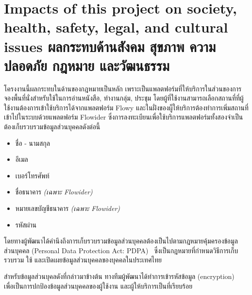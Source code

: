 \section{\ifenglish%
Impacts of this project on society, health, safety, legal, and cultural issues
\else%
ผลกระทบด้านสังคม สุขภาพ ความปลอดภัย กฎหมาย และวัฒนธรรม
\fi}

โครงงานนี้ผลกระทบในด้านของกฎหมายเป็นหลัก เพราะเป็นแพลตฟอร์มที่ให้บริการในส่วนของการจองพื้นที่นั่งสำหรับใช้ในการอ่านหนังสือ, ทํางานกลุ่ม, ประชุม โดยผู้ที่ใช้งานสามารถเลือกสถานที่ที่ผู้ใช้งานต้องการเข้าใช้บริการได้จากแพลตฟอร์ม Flowy และในฝั่งของผู็ให้บริการต้องทำการเพิ่มสถานที่เข้าไปในระบบด้วยแพลตฟอร์ม Flowider ซึ่งการลงทะเบียนเพื่อใช้บริการแพลตฟอร์มทั้งสองจำเป็นต้องเก็บรวบรวมข้อมูลส่วนบุคคลดังต่อนี้
\begin{itemize}
    \item ชื่อ - นามสกุล
    \item อีเมล
    \item เบอร์โทรศัพท์
    \item ชื่อธนาคาร \textit{(เฉพาะ Flowider)}
    \item หมายเลขบัญชีธนาคาร \textit{(เฉพาะ Flowider)}
    \item รหัสผ่าน
\end{itemize}
โดยทางผู้พัฒนาได้คำนึงถึงการเก็บรวบรวมข้อมูลส่วนบุคคลต้องเป็นไปตามกฎหมายคุ้มครองข้อมูลส่วนบุคคล (Personal Data Protection Act: PDPA)~\cite{pdpa} ซึ่งเป็นกฎหมายที่กำหนดวิธีการเก็บรวบรวม ใช้ และเปิดเผยข้อมูลส่วนบุคคลของบุคคลในประเทศไทย

สำหรับข้อมูลส่วนบุคลดังที่กล่าวมาข้างต้น ทางทีมผู้พัฒนาได้ทำการเข้ารหัสข้อมูล (encryption)~\cite{encryption} เพื่อเป็นการปกป้องข้อมูลส่วนบุคคลของผู้ใช้งาน และผู้ให้บริการเป็นที่เรียบร้อย
